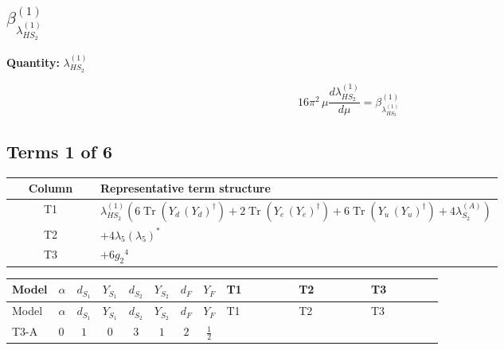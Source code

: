 \documentclass[8pt]{article}
\begin{document}
\begin{landscape}
\section*{$\beta_{\lambda_{HS_2}^{(1)}}^{(1)}$}
\noindent\textbf{Quantity: }$\lambda_{HS_2}^{(1)}$\par\smallskip
\[16\pi^2\,\mu\frac{d \lambda_{HS_2}^{(1)}}{d\mu}=\beta_{\lambda_{HS_2}^{(1)}}^{(1)}\]
\subsection*{Terms 1 of 6}
\begin{center}
\begin{tabular}{@{}c >{\raggedright\arraybackslash}p{0.82\linewidth}@{}}
\toprule
Column & Representative term structure \\
\midrule
T1 & \(\displaystyle {\lambda_{HS_2}^{(1)}} (6 \operatorname{Tr}\!\left({Y_d}\,\left({Y_d}\right)^{\dagger}\right)+2 \operatorname{Tr}\!\left({Y_e}\,\left({Y_e}\right)^{\dagger}\right)+6 \operatorname{Tr}\!\left({Y_u}\,\left({Y_u}\right)^{\dagger}\right)+4 {\lambda_{S_2}^{(A)}})\) \\
\midrule
T2 & \(\displaystyle +4 {\lambda_5} \left({\lambda_5}\right)^{*}\) \\
\midrule
T3 & \(\displaystyle +6 {g_2}^4\) \\
\midrule
\bottomrule
\end{tabular}
\end{center}
\smallskip
\tiny
\begin{longtable}{@{}llcccccc >{\raggedright\arraybackslash}p{0.21\linewidth} >{\raggedright\arraybackslash}p{0.21\linewidth} >{\raggedright\arraybackslash}p{0.21\linewidth}@{}}
\toprule
Model & $\alpha$ & $d_{S_1}$ & $Y_{S_1}$ & $d_{S_2}$ & $Y_{S_2}$ & $d_F$ & $Y_F$ & T1 & T2 & T3 \\
\midrule
\endfirsthead
\toprule
Model & $\alpha$ & $d_{S_1}$ & $Y_{S_1}$ & $d_{S_2}$ & $Y_{S_2}$ & $d_F$ & $Y_F$ & T1 & T2 & T3 \\
\midrule
\endhead
T3-A & $0$ & $1$ & $0$ & $3$ & $1$ & $2$ & $\frac{1}{2}$ & \scriptsize\adjustbox{max width=\linewidth}{$\begin{gathered} {\lambda_{HS_2}^{(1)}} (6 \operatorname{Tr}\!\left({Y_d}\,\left({Y_d}\right)^{\dagger}\right)+2 \operatorname{Tr}\!\left({Y_e}\,\left({Y_e}\right)^{\dagger}\right)+6 \operatorname{Tr}\!\left({Y_u}\,\left({Y_u}\right)^{\dagger}\right)+4 {\lambda_{S_2}^{(A)}})\end{gathered}$} & \scriptsize\adjustbox{max width=\linewidth}{$\begin{gathered} +4 {\lambda_5} \left({\lambda_5}\right)^{*}\end{gathered}$} & \scriptsize\adjustbox{max width=\linewidth}{$\begin{gathered} +6 {g_2}^4\end{gathered}$} \\

\end{longtable}
\end{landscape}
\end{document}
